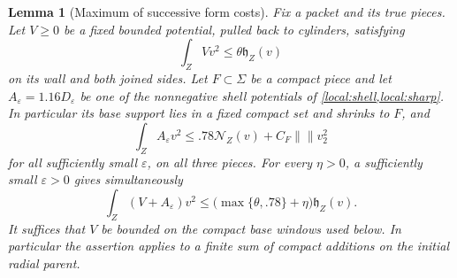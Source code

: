 \documentclass[11pt]{article}
\numberwithin{equation}{section}
\newtheorem{lemma}[theorem]{Lemma}
\theoremstyle{definition}
\theoremstyle{remark}
\begin{document}
\begin{lemma}[Maximum of successive form costs]\label{shield:maximum}
Fix a packet and its true pieces.  Let $V\ge0$ be a fixed bounded
potential, pulled back to cylinders, satisfying
\begin{equation}\label{shield:old-bound}
 \int_Z Vv^2\le\theta\mathfrak h_Z(v)
\end{equation}
on its wall and both joined sides.  Let $F\subset\Sigma$ be a compact
piece and let $A_\varepsilon=1.16D_\varepsilon$ be one of the nonnegative shell
potentials of \cref{local:shell,local:sharp}.  In particular its base
support lies in a fixed compact set and shrinks to $F$, and
\begin{equation}\label{shield:local-input}
 \int_Z A_\varepsilon v^2\le .78\mathcal N_Z(v)+C_F\left\lVert{}\right\rVert v_2^2
\end{equation}
for all sufficiently small $\varepsilon$, on all three pieces.
For every $\eta>0$, a sufficiently small $\varepsilon>0$ gives simultaneously
\begin{equation}\label{shield:maximum-bound}
 \int_Z(V+A_\varepsilon)v^2
 \le\bigl(\max\{\theta,.78\}+\eta\bigr)\mathfrak h_Z(v).
\end{equation}
It suffices that $V$ be bounded on the compact base windows used below.
In particular the assertion applies to a finite sum of compact
additions on the initial radial parent.
\end{lemma}
\end{document}
